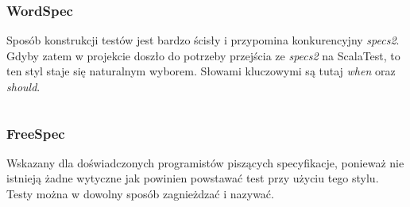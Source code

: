 \documentclass[brudnopis]{xmgr}
\begin{document}
\subsubsection{WordSpec}

Sposób konstrukcji testów jest bardzo ścisły i przypomina konkurencyjny \emph{specs2}. Gdyby zatem w projekcie doszło do potrzeby przejścia ze \emph{specs2} na ScalaTest, to ten styl staje się naturalnym wyborem. Słowami kluczowymi są tutaj \emph{when} oraz \emph{should}.

\inputminted[fontsize=\small]{scala}{code/WordSpec.scala}

\subsubsection{FreeSpec}

Wskazany dla doświadczonych programistów piszących specyfikacje, ponieważ nie istnieją żadne wytyczne jak powinien powstawać test przy użyciu tego stylu. Testy można w dowolny sposób zagnieżdzać i nazywać.

\inputminted[fontsize=\small]{scala}{code/FreeSpec.scala}

\end{document}
